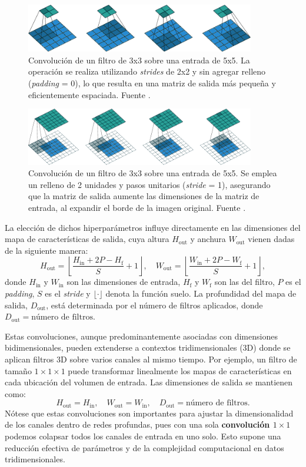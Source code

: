 \begin{figure}[H]
	\centering
	\includegraphics[width=100mm]{img/stride.png}
	\caption{Convolución de un filtro de 3x3 sobre una entrada de 5x5. La operación
		se realiza utilizando \textit{strides} de 2x2 y sin agregar relleno (\textit{padding}
		= 0), lo que resulta en una matriz de salida más pequeña y eficientemente
		espaciada. Fuente \cite{Dumoulin2016AGT}.}
\end{figure}
\begin{figure}[H]
	\centering
	\includegraphics[width=100mm]{img/padding.png}
	\caption{Convolución de un filtro de 3x3 sobre una entrada de 5x5. Se emplea un
		relleno de 2 unidades y pasos unitarios (\textit{stride} = 1), asegurando que la
		matriz de salida aumente las dimensiones de la matriz de entrada, al expandir
		el borde de la imagen original. Fuente \cite{Dumoulin2016AGT}.}
\end{figure}

La elección de dichos hiperparámetros influye directamente en las dimensiones
del mapa de características de salida, cuya altura $H_{\text{out}}$ y anchura $W_{\text{out}}$
vienen dadas de la siguiente manera:
\[
H_{\text{out}}= \left\lfloor \frac{H_{\text{in}}+ 2P - H_{\text{f}}}{S}+ 1 \right
\rfloor, \quad W_{\text{out}}= \left\lfloor \frac{W_{\text{in}}+ 2P - W_{\text{f}}}{S}
+ 1 \right\rfloor,
\]
donde $H_{\text{in}}$ y $W_{\text{in}}$ son las dimensiones de entrada, $H_{\text{f}}$
y $W_{\text{f}}$ son las del filtro, $P$ es el \textit{padding}, $S$ es el
\textit{stride} y $\lfloor \cdot \rfloor$ denota la función suelo. La
profundidad del mapa de salida, $D_{\text{out}}$, está determinada por el número
de filtros aplicados, donde $D_{\text{out}}= \text{número de filtros}$.

Estas convoluciones, aunque predominantemente asociadas con dimensiones
bidimensionales, pueden extenderse a contextos tridimensionales (3D) donde se aplican
filtros 3D sobre varios canales al mismo tiempo. Por ejemplo, un filtro de tamaño
$1 \times 1 \times 1$ puede transformar linealmente los mapas de características
en cada ubicación del volumen de entrada. Las dimensiones de salida se mantienen
como:
\[
H_{\text{out}}= H_{\text{in}}, \quad W_{\text{out}}= W_{\text{in}}, \quad D_{\text{out}}
= \text{número de filtros}.
\]
Nótese que estas convoluciones son importantes para ajustar la dimensionalidad de
los canales dentro de redes profundas, pues con una sola \textbf{convolución
	$1 \times 1$} podemos colapsar todos los canales de entrada en uno solo. Esto
supone una reducción efectiva de parámetros y de la complejidad computacional en
datos tridimensionales.

